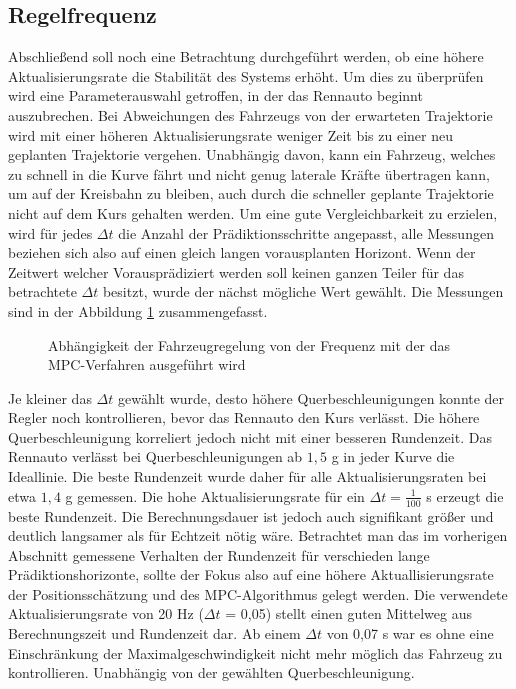 \documentclass{like}
\begin{document}
\subsection{Regelfrequenz}
Abschließend soll noch eine Betrachtung durchgeführt werden, ob eine höhere Aktualisierungsrate die Stabilität des Systems erhöht. Um dies zu überprüfen wird eine Parameterauswahl getroffen, in der das Rennauto beginnt auszubrechen. Bei Abweichungen des Fahrzeugs von der erwarteten Trajektorie wird mit einer höheren Aktualisierungsrate weniger Zeit bis zu einer neu geplanten Trajektorie vergehen. Unabhängig davon, kann ein Fahrzeug, welches zu schnell in die Kurve fährt und nicht genug laterale Kräfte übertragen kann, um auf der Kreisbahn zu bleiben, auch durch die schneller geplante Trajektorie nicht auf dem Kurs gehalten werden. 
Um eine gute Vergleichbarkeit zu erzielen, wird für jedes $\Delta t$ die Anzahl der Prädiktionsschritte angepasst, alle Messungen beziehen sich also auf einen gleich langen vorausplanten Horizont. Wenn der Zeitwert welcher Vorausprädiziert werden soll keinen ganzen Teiler für das betrachtete $\Delta t$ besitzt, wurde der nächst mögliche Wert gewählt. Die Messungen sind in der Abbildung \ref{fig:measureUpdateRate} zusammengefasst. 
\begin{figure}[ht!]
	\centering
	\caption{Abhängigkeit der Fahrzeugregelung von der Frequenz mit der das \ac{MPC}-Verfahren ausgeführt wird }\label{fig:measureUpdateRate}
\end{figure}
Je kleiner das $\Delta t$ gewählt wurde, desto höhere Querbeschleunigungen konnte der Regler noch kontrollieren, bevor das Rennauto den Kurs verlässt. Die höhere Querbeschleunigung korreliert jedoch nicht mit einer besseren Rundenzeit. Das Rennauto verlässt bei Querbeschleunigungen ab $1,5$ g in jeder Kurve die Ideallinie. Die beste Rundenzeit wurde daher für alle Aktualisierungsraten bei etwa $1,4$ g gemessen. 
Die hohe Aktualisierungsrate für ein $\Delta t = \frac{1}{100}$ s erzeugt die beste Rundenzeit. Die Berechnungsdauer ist jedoch auch signifikant größer und deutlich langsamer als für Echtzeit nötig wäre. Betrachtet man das im vorherigen Abschnitt gemessene Verhalten der Rundenzeit für verschieden lange Prädiktionshorizonte, sollte der Fokus also auf eine höhere Aktuallisierungsrate der Positionsschätzung und des \ac{MPC}-Algorithmus gelegt werden. Die verwendete Aktualisierungsrate von 20 Hz ($\Delta t$ = 0,05) stellt einen guten Mittelweg aus Berechnungszeit und Rundenzeit dar. Ab einem $\Delta t$ von 0,07 s war es ohne eine Einschränkung der Maximalgeschwindigkeit nicht mehr möglich das Fahrzeug zu kontrollieren. Unabhängig von der gewählten Querbeschleunigung. 
\end{document}
